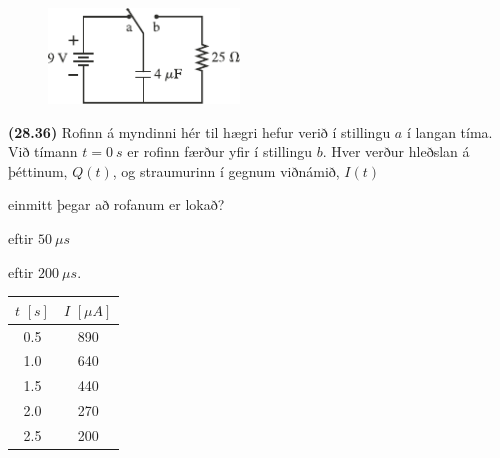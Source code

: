 \ifdefined \wholebook \else\documentclass[oneside]{book}\usepackage{EdlBook}\graphicspath{{figures/}}
\begin{document}
\begin{enumerate}[label = \textbf{(\alph*)}]

\begin{minipage}{\linewidth}
\begin{figure}
\vspace{-0.5cm}
\includegraphics[width = 2in]{figures/rk2836.pdf}
\end{figure}

\item[\textbf{(28.36)}] Rofinn á myndinni hér til hægri hefur verið í stillingu $a$ í langan tíma. Við tímann $t = \SI{0}{s}$ er rofinn færður yfir í stillingu $b$. Hver verður hleðslan á þéttinum, $Q(t)$, og straumurinn í gegnum viðnámið, $I(t)$ \begin{enumerate*}[label = \textbf{(\alph*)}]
    \item einmitt þegar að rofanum er lokað?
    \item eftir $\SI{50}{\mu s}$
    \item eftir $\SI{200}{\mu s}$.
\end{enumerate*}

\end{minipage}

\vspace{1cm}

\begin{minipage}{\linewidth}
\begin{table}
\vspace{-0.5cm}
\begin{tabular}{|c|c|}
        \hline
          $t \, \, [\si{s}]$   &  $I \, \, [\si{\mu A}]$ \\ \hline \hline
            \SI{0.5}{} & \SI{890}{} \\ \hline
            \SI{1.0}{} & \SI{640}{} \\ \hline
            \SI{1.5}{} & \SI{440}{} \\ \hline
            \SI{2.0}{} & \SI{270}{} \\ \hline
            \SI{2.5}{} & \SI{200}{} \\ \hline
        \end{tabular}
\end{table}


\end{minipage}
\end{enumerate}
\end{document}
